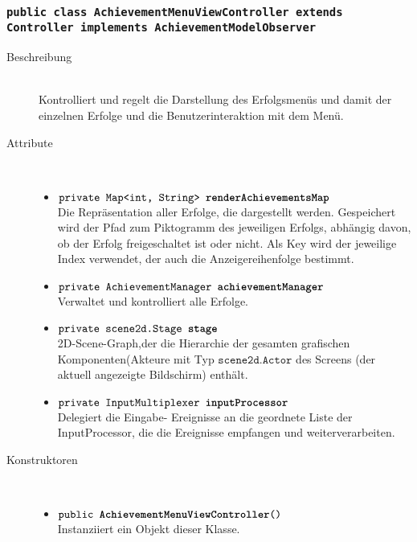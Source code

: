 
\subsubsection{\normalfont \texttt{public class \textbf{AchievementMenuViewController} extends Controller implements AchievementModelObserver}}

\begin{description}
\item[Beschreibung] \hfill \\ Kontrolliert und regelt die Darstellung des Erfolgsmenüs und damit der einzelnen Erfolge und die Benutzerinteraktion mit dem Menü.
\item[Attribute] \hfill \\
	\vspace{-.8cm}
	\begin{itemize}
		\item $\texttt{private Map<int, String> \textbf{renderAchievementsMap}}$ \\ Die Repräsentation aller Erfolge, die dargestellt werden. Gespeichert wird der Pfad zum Piktogramm des jeweiligen Erfolgs, abhängig davon, ob der Erfolg freigeschaltet ist oder nicht. Als Key wird der jeweilige Index verwendet, der auch die Anzeigereihenfolge bestimmt.
		\item $\texttt{private AchievementManager \textbf{achievementManager}}$ \\ Verwaltet und kontrolliert alle Erfolge.
		\item $\texttt{private scene2d.Stage \textbf{stage}}$ \\ 2D-Scene-Graph,der die Hierarchie der gesamten grafischen Komponenten(Akteure mit Typ $\texttt{scene2d.Actor}$ des Screens (der aktuell angezeigte Bildschirm) enthält. 
		\item $\texttt{private InputMultiplexer \textbf{inputProcessor}}$ \\ Delegiert die Eingabe- Ereignisse an die geordnete Liste der InputProcessor, die die Ereignisse empfangen und weiterverarbeiten.
	\end{itemize}
	
\item[Konstruktoren] \hfill \\
	\vspace{-.8cm}
	\begin{itemize}
		\item $\texttt{public \textbf{AchievementMenuViewController}()}$ \\ Instanziiert ein Objekt dieser Klasse.
	\end{itemize}
	

\end{description}
